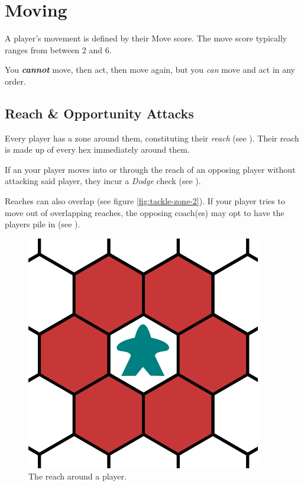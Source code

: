 \section{Moving} \label{moving}
A player's movement is defined by their Move score.
The move score typically ranges from between 2 and 6.

\begin{note}
    You \textit{\textbf{cannot}} move, then act, then move again, but you \textit{can} move and act in any order.
\end{note}

\subsection{Reach \& Opportunity Attacks}
Every player has a zone around them, constituting their \textit{reach} (see ).
Their reach is made up of every hex immediately around them.

If an your player moves into or through the reach of an opposing player without attacking said player, they incur a \textit{Dodge} check (see ).

\begin{note}
    Reaches can also overlap (see figure \ref{fig:tackle-zone-2}).
    If your player tries to move out of overlapping reaches, the opposing coach(es) may opt to have the players pile in (see ).
\end{note}

\begin{figure}
    \centering
    \includegraphics{graphics/tackle-zones-1.png}
    \caption{The reach around a player.}
    \label{fig:tackle-zone-1}
\end{figure}

